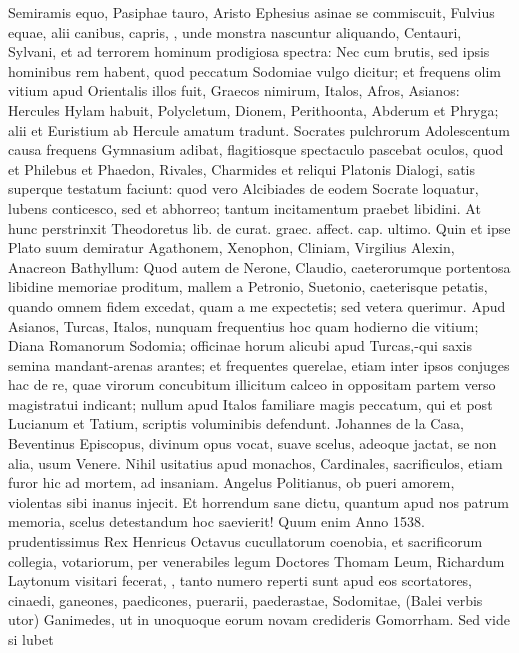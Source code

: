 {Semiramis equo, Pasiphae tauro, Aristo Ephesius asinae se commiscuit,
Fulvius equae, alii canibus, capris, \etc{}, unde monstra nascuntur
aliquando, Centauri, Sylvani, et ad terrorem hominum prodigiosa
spectra: Nec cum brutis, sed ipsis hominibus rem habent, quod peccatum
Sodomiae vulgo dicitur; et frequens olim vitium apud Orientalis illos
fuit, Graecos nimirum, Italos, Afros, Asianos: Hercules Hylam
habuit, Polycletum, Dionem, Perithoonta, Abderum et Phryga; alii et
Euristium ab Hercule amatum tradunt. Socrates pulchrorum Adolescentum
causa frequens Gymnasium adibat, flagitiosque spectaculo pascebat
oculos, quod et Philebus et Phaedon, Rivales, Charmides et
reliqui Platonis Dialogi, satis superque testatum faciunt: quod
vero Alcibiades de eodem Socrate loquatur, lubens conticesco, sed et
abhorreo; tantum incitamentum praebet libidini. At hunc perstrinxit
Theodoretus lib. de curat. graec. affect. cap. ultimo. Quin et ipse
Plato suum demiratur Agathonem, Xenophon, Cliniam, Virgilius Alexin,
Anacreon Bathyllum: Quod autem de Nerone, Claudio, caeterorumque
portentosa libidine memoriae proditum, mallem a Petronio, Suetonio,
caeterisque petatis, quando omnem fidem excedat, quam a me expectetis;
sed vetera querimur. Apud Asianos, Turcas, Italos, nunquam
frequentius hoc quam hodierno die vitium; Diana Romanorum Sodomia;
officinae horum alicubi apud Turcas,-qui saxis semina mandant-arenas
arantes; et frequentes querelae, etiam inter ipsos conjuges hac de re,
quae virorum concubitum illicitum calceo in oppositam partem verso
magistratui indicant; nullum apud Italos familiare magis peccatum, qui
et post Lucianum et Tatium, scriptis voluminibis defendunt.
Johannes de la Casa, Beventinus Episcopus, divinum opus vocat, suave
scelus, adeoque jactat, se non alia, usum Venere. Nihil usitatius apud
monachos, Cardinales, sacrificulos, etiam furor hic ad mortem, ad
insaniam. Angelus Politianus, ob pueri amorem, violentas sibi
inanus injecit. Et horrendum sane dictu, quantum apud nos patrum
memoria, scelus detestandum hoc saevierit! Quum enim Anno 1538.
prudentissimus Rex Henricus Octavus cucullatorum coenobia, et
sacrificorum collegia, votariorum, per venerabiles legum Doctores
Thomam Leum, Richardum Laytonum visitari fecerat, \etc{}, tanto numero
reperti sunt apud eos scortatores, cinaedi, ganeones, paedicones,
puerarii, paederastae, Sodomitae, (Balei verbis utor) Ganimedes,
\etc{} ut in unoquoque eorum novam credideris Gomorrham. Sed vide si lubet
}
